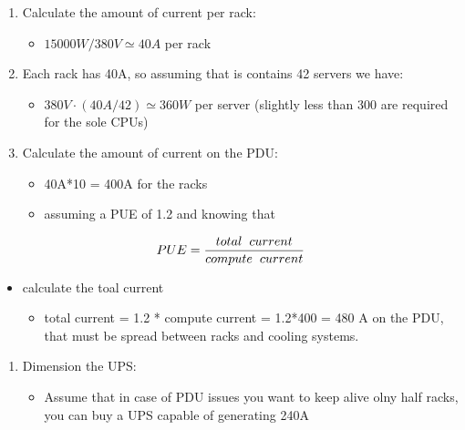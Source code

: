 \begin{enumerate}
\def\labelenumi{\arabic{enumi}.}
\item
  Calculate the amount of current per rack:

  \begin{itemize}
  \item
    $15000W/380V \simeq 40A$ per rack
  \end{itemize}
\item
  Each rack has 40A, so assuming that is contains 42 servers we have:

  \begin{itemize}
  \item
    $380V\cdot(40A/42) \simeq 360W$ per server (slightly less than
    300 are required for the sole CPUs)
  \end{itemize}
\item
  Calculate the amount of current on the PDU:

  \begin{itemize}
  \item
    40A*10 = 400A for the racks
  \item
    assuming a PUE of 1.2 and knowing that
  \end{itemize}
\end{enumerate}

$$PUE = \frac{total\hspace{0.2cm}current}{compute\hspace{0.2cm}current}$$

\begin{itemize}
\item
  calculate the toal current

  \begin{itemize}
  \item
    total current = 1.2 * compute current = 1.2*400 = 480 A on the PDU,
    that must be spread between racks and cooling systems.
  \end{itemize}
\end{itemize}

\begin{enumerate}
\def\labelenumi{\arabic{enumi}.}
\item
  Dimension the UPS:

  \begin{itemize}
  \item
    Assume that in case of PDU issues you want to keep alive olny half
    racks, you can buy a UPS capable of generating 240A
  \end{itemize}
\end{enumerate}

